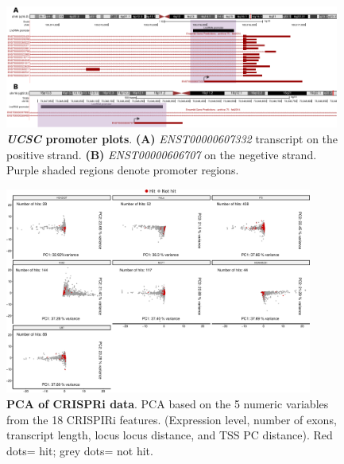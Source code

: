 \begin{figure}[!htb]
    \centering
    \includegraphics[width=0.98\textwidth]{img/appendix/appendix_fig/ml/ucsc.lncRNA.promoters.v2.pdf}
    \caption[\textit{UCSC} promoter plots]{\textbf{\textit{UCSC} promoter plots}. \textbf{(A)} \textit{ENST00000607332} transcript on the positive strand. \textbf{(B)} \textit{ENST00000606707} on the negetive strand. Purple shaded regions denote promoter regions.}
    \label{supp-fig:ucsc_promoters_examples}
\end{figure}

\begin{figure}[!htb]
  \centering
  \includegraphics[width=0.9\textwidth]{plots/appendix/ml/pca.hit.percell.png}
  \caption[PCA of CRISPRi data]{\textbf{PCA of CRISPRi data}. PCA based on the 5 numeric variables from the 18 CRISPIRi features. (Expression level, number of exons, transcript length, locus locus distance, and TSS PC distance). Red dots= hit; grey dots= not hit.}
  \label{fig:pca-hits}
\end{figure}

